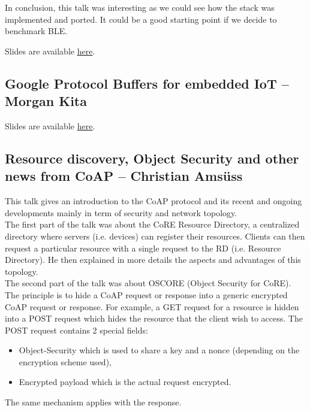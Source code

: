 \documentclass[journal, a4paper]{../IEEEtran}
\begin{document}
In conclusion, this talk was interesting as we could see how the stack was implemented and ported.
It could be a good starting point if we decide to benchmark BLE.

Slides are available \href{http://summit.riot-os.org/2018/wp-content/uploads/sites/10/2018/09/1_1-Szymon-Janc-NimBLE.pdf}{here}.

\subsection{Google Protocol Buffers for embedded IoT -- Morgan Kita}


Slides are available \href{http://summit.riot-os.org/2018/wp-content/uploads/sites/10/2018/09/1_2-Kita-Morgan-Protobuf.pdf}{here}.

\subsection{Resource discovery, Object Security and other news from CoAP -- Christian Amsüss}
This talk gives an introduction to the CoAP protocol and its recent and ongoing developments mainly in term of security and network topology.\\

The first part of the talk was about the CoRE Resource Directory, a centralized directory where servers (i.e. devices) can register their resources.
Clients can then request a particular resource with a single request to the RD (i.e. Resource Directory).
He then explained in more details the aspects and advantages of this topology.\\

The second part of the talk was about OSCORE (Object Security for CoRE).
The principle is to hide a CoAP request or response into a generic encrypted CoAP request or response.
For example, a GET request for a resource is hidden into a POST request which hides the resource that the client wish to access.
The POST request contains 2 special fields:
\begin{itemize}
    \item Object-Security which is used to share a key and a nonce (depending on the encryption scheme used),
    \item Encrypted payload which is the actual request encrypted.
\end{itemize}
The same mechanism applies with the response.\\
\end{document}
